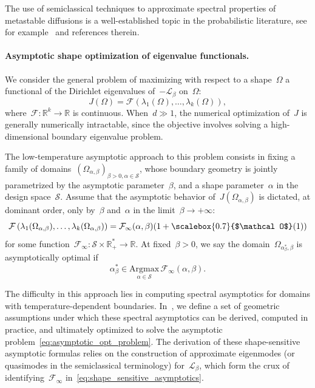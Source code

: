 \documentclass[a4]{article}
\newcommand{\cL}{\mathcal{L}}
\newcommand{\R}{\mathbb{R}}
\newcommand{\1}{\mathbbm 1}
\newcommand{\smallo}{\scalebox{0.7}{$\mathcal O$}}
\begin{document}
    The use of semiclassical techniques to approximate spectral properties of metastable diffusions is a well-established topic in the probabilistic literature, see for example~\cite{HS85,BGK05,HN04,LN15,DGLLPN19,DGLLPN20,LPN21,LRS24,BLS24} and references therein.
    \paragraph{Asymptotic shape optimization of eigenvalue functionals.}
    We consider the general problem of maximizing with respect to a shape~$\Omega$ a functional of the Dirichlet eigenvalues of~$-\cL_\beta$ on~$\Omega$:
    \begin{equation}
        \label{eq:shape_functional}
        J(\Omega) = \mathcal F(\lambda_{1}(\Omega),\dots,\lambda_{k}(\Omega)),
    \end{equation}
    where~$\mathcal F:\R^k\to\R$ is continuous. When~$d\gg 1$, the numerical optimization of~$J$ is generally numerically intractable, since the objective involves solving a high-dimensional boundary eigenvalue problem. 

    The low-temperature asymptotic approach to this problem consists in fixing a family of domains~$(\Omega_{\alpha,\beta})_{\beta>0,\alpha\in\mathcal S}$, whose boundary geometry is jointly parametrized by the asymptotic parameter~$\beta$, and a shape parameter~$\alpha$ in the design space~$\mathcal S$.
    Assume that the asymptotic behavior of~$J(\Omega_{\alpha,\beta})$ is dictated, at dominant order, only by~$\beta$ and~$\alpha$ in the limit~$\beta\to+\infty$:
            \begin{equation}
                \label{eq:shape_sensitive_asymptotics}
            \mathcal F\left(\lambda_1(\Omega_{\alpha,\beta}),\dots,\lambda_k(\Omega_{\alpha,\beta})\right)=\mathcal F_{\infty}(\alpha,\beta)(1+\smallo(1))
        \end{equation}
        for some function~$\mathcal F_\infty:\mathcal S \times \R_+^*\to \R$.
    At fixed~$\beta>0$, we say the domain~$\Omega_{\alpha^*_\beta,\beta}$ is asymptotically optimal if
    \begin{equation}
        \label{eq:asymptotic_opt_problem}
        \alpha^*_\beta \in \underset{\alpha \in \mathcal S}{\mathrm{Argmax}}\, \mathcal F_\infty(\alpha,\beta).
    \end{equation}

    The difficulty in this approach lies in computing spectral asymptotics for domains with temperature-dependent boundaries.
    In~\cite{BLS24}, we define a set of geometric assumptions under which these spectral asymptotics can be derived, computed in practice, and ultimately optimized to solve the asymptotic problem~\eqref{eq:asymptotic_opt_problem}.
    The derivation of these shape-sensitive asymptotic formulas relies on the construction of approximate eigenmodes (or quasimodes in the semiclassical terminology) for~$\cL_\beta$, which form the crux of identifying~$\mathcal F_\infty$ in~\eqref{eq:shape_sensitive_asymptotics}.
\end{document}
